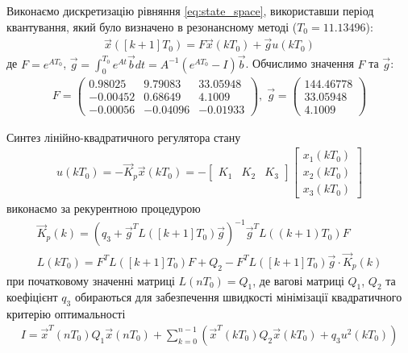 Виконаємо дискретизацію рівняння \eqref{eq:state_space}, використавши період квантування,
який було визначено в резонансному методі ($T_0 = 11.13496$):
\begin{gather}
    \vec{x}\left(\left[k+1\right]T_0\right) = F \vec{x}\left(kT_0\right) + \vec{g} u\left(k T_0\right)
\end{gather}
де $F = e^{A T_0}$, $\vec{g} = \int_0^{T_0} e^{A t} \vec{b} dt = A^{-1} \left(e^{A T_0} - I\right) \vec{b}$.
Обчислимо значення $F$ та $\vec{g}$:
\begin{gather*}
    F = \begin{pmatrix}
        0.98025  & 9.79083  & 33.05948 \\
        -0.00452 & 0.68649  & 4.1009 \\
        -0.00056 & -0.04096 & -0.01933
    \end{pmatrix}, \;
    \vec{g} = \begin{pmatrix}
        144.46778 \\ 33.05948 \\ 4.1009
    \end{pmatrix}
\end{gather*}

Синтез лінійно-квадратичного регулятора стану 
\begin{gather}\label{eq:lin_quad_reg}
    u\left(k T_0\right) = -\vec{K}_p \vec{x}\left(k T_0\right) = 
    - \begin{bmatrix}
        K_1 & K_2 & K_3
    \end{bmatrix}
    \begin{bmatrix}
        x_1\left(k T_0\right) \\
        x_2\left(k T_0\right) \\
        x_3\left(k T_0\right)
    \end{bmatrix}
\end{gather}
виконаємо за рекурентною процедурою
\begin{gather*}
    \vec{K}_p (k) = \left(q_3 + \vec{g}^T L\left([k+1]T_0\right) \vec{g}\right)^{-1}
    \vec{g}^T L\left((k+1)T_0\right) F \\
    L\left(k T_0\right) = F^T L\left([k+1]T_0\right) F + Q_2 - 
    F^T L\left([k+1]T_0\right) \vec{g} \cdot \vec{K}_p (k)
\end{gather*}
при початковому значенні матриці $L\left(n T_0\right) = Q_1$, де вагові матриці
$Q_1$, $Q_2$ та коефіцієнт $q_3$ обираються для забезпечення швидкості мінімізації квадратичного критерію оптимальності
\begin{gather*}
    I = \vec{x}^T \left(nT_0\right) Q_1 \vec{x} \left(nT_0\right) + 
    \sum_{k=0}^{n-1} \left(
        \vec{x}^T \left(k T_0\right) Q_2 \vec{x} \left(k T_0\right) + q_3 u^2 \left(k T_0\right)
    \right)
\end{gather*}

